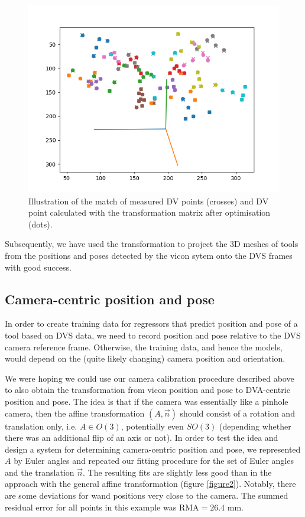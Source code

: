 \documentclass{article}
\begin{document}
\begin{figure}
  \includegraphics[width=\textwidth]{figure_match.png}
  \caption{\label{figure1} Illustration of the match of measured DV points (crosses) and DV point calculated with the transformation matrix after optimisation (dots).}
\end{figure}

Subsequently, we have used the transformation to project the 3D meshes of tools from the positions and poses detected by the vicon sytem onto the DVS frames with good success.

\subsection{Camera-centric position and pose}
In order to create training data for regressors that predict position and pose of a tool based on DVS data, we need to record position and pose relative to the DVS camera reference frame. Otherwise, the training data, and hence the models, would depend on the (quite likely changing) camera position and orientation.

We were hoping we could use our camera calibration procedure described above to also obtain the transformation from vicon position and pose to DVA-centric position and pose. The idea is that if the camera was essentially like a pinhole camera, then the affine transformation $(A,\vec{n})$ should consist of a rotation  and translation only, i.e. $A \in O(3)$, potentially even $SO(3)$ (depending whether there was an additional flip of an axis or not).
In order to test the idea and design a system for determining camera-centric position and pose, we represented $A$ by Euler angles and repeated our fitting procedure for the set of Euler angles and the translation $\vec{n}$. The resulting fits are slightly less good than in the approach with the general affine transformation (figure \ref{figure2}). Notably, there are some deviations for wand positions very close to the camera. The summed residual error for all points in this example was RMA$= 26.4$ mm.
\end{document}
